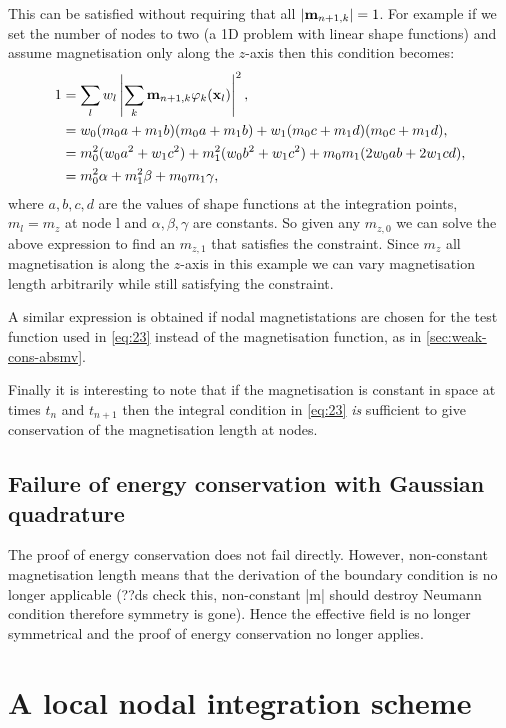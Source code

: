 This can be satisfied without requiring that all $\left|{\mathbf{m}_{n+1, k}} \right| = 1$.
For example if we set the number of nodes to two (a 1D problem with linear shape functions) and assume magnetisation only along the $z$-axis then this condition becomes:
\begin{equation}
  \begin{aligned}
    1 &= \sum_l w_l \left|{\sum_k \mathbf{m}_{n+1, k} \varphi_k(\mathbf{x}_l)} \right|^2, \\
    &= w_0 (m_0 a + m_1 b)(m_0 a + m_1 b) + w_1 (m_0 c + m_1 d)(m_0 c + m_1 d), \\
    &= m_0^2 (w_0 a^2 + w_1 c^2) + m_1^2 (w_0 b^2 + w_1 c^2) + m_0 m_1 (2w_0ab + 2w_1cd), \\
    &= m_0^2 \alpha + m_1^2 \beta + m_0 m_1 \gamma, \\
  \end{aligned}
\end{equation}
where $a,b,c,d$ are the values of shape functions at the integration points, $m_l = m_{z}$ at node l and $\alpha, \beta, \gamma$ are constants.
So given any $m_{z,0}$ we can solve the above expression to find an $m_{z,1}$ that satisfies the constraint.
Since $m_z$ all magnetisation is along the $z$-axis in this example we can vary magnetisation length arbitrarily while still satisfying the constraint.

A similar expression is obtained if nodal magnetistations are chosen for the test function used in \eqref{eq:23} instead of the magnetisation function, as in \autoref{sec:weak-cons-absmv}.

Finally it is interesting to note that if the magnetisation is constant in space at times $t_n$ and $t_{n+1}$ then the integral condition in \eqref{eq:23} \emph{is} sufficient to give conservation of the magnetisation length at nodes.


\subsection{Failure of energy conservation with Gaussian quadrature}

The proof of energy conservation does not fail directly.
However, non-constant magnetisation length means that the derivation of the boundary condition is no longer applicable (??ds check this, non-constant |m| should destroy Neumann condition therefore symmetry is gone).
Hence the effective field is no longer symmetrical and the proof of energy conservation no longer applies.

\section{A local nodal integration scheme}

